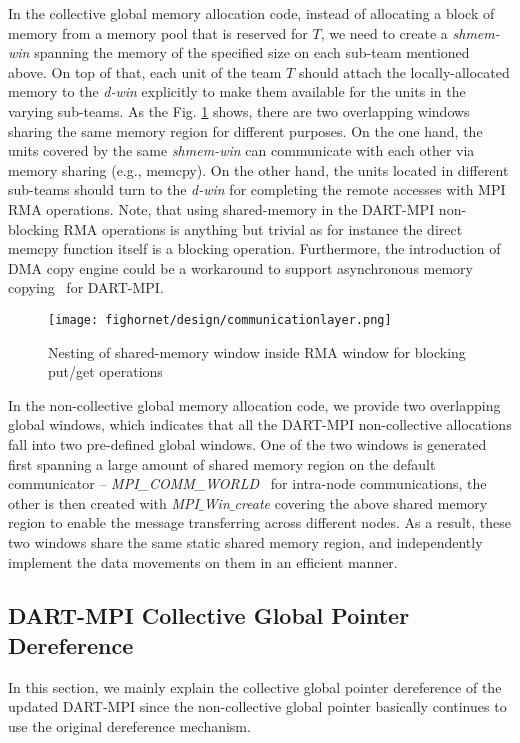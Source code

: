 \documentclass{llncs}
\begin{document}
{In the collective global memory allocation code, instead of allocating a block of memory 
from a memory pool that is reserved for $T$, we need to create a \mbox{\textit{shmem-win}} spanning the 
memory of the specified size on each sub-team mentioned above.
On top of that, each unit of the team $T$ should attach the locally-allocated memory
to the \mbox{\textit{d-win}} explicitly to make them available for the units in the varying \mbox{sub-teams}. As the 
Fig. \ref{structure} shows, there are two overlapping windows sharing the same memory region for different purposes.
On the one hand, the units covered by the same \mbox{\textit{shmem-win}} can communicate with each other via
memory sharing (e.g., memcpy). On the other hand, the units located in different \mbox{sub-teams} should turn to the \mbox{\textit{d-win}} for
completing the remote accesses with MPI RMA operations.
Note, that using shared-memory in the 
DART-MPI non-blocking RMA operations is anything but trivial as for instance the direct memcpy function itself 
is a blocking operation. Furthermore, the introduction of DMA copy engine could be a workaround to support 
asynchronous memory copying~\cite{async} for DART-MPI. 

\begin{figure}[tb]
\begin{center}
\texttt{[image: fighornet/design/communicationlayer.png]}
\end{center} 
\caption{Nesting of shared-memory window inside RMA window for blocking put/get operations}
\label{structure}
\end{figure}

In the \mbox{non-collective} global memory allocation code, we provide two overlapping global 
windows, 
which indicates that all the \mbox{DART-MPI} \mbox{non-collective} 
allocations fall into two \mbox{pre-defined} global windows. 
One of the two windows is generated first spanning a large amount of shared memory region 
on the default communicator -- {\em MPI\_COMM\_WORLD}~\cite{mpi3} for intra-node 
communications, the other is
then created with {\em MPI$\_$Win$\_$create} covering the above
shared memory region to enable the message transferring across different nodes. As a result,
these two windows share the same static shared memory region, and independently 
implement the data movements on them in an efficient manner.
\subsection{DART-MPI Collective Global Pointer Dereference}
In this section, we 
mainly explain the collective global pointer dereference of 
the updated \mbox{DART-MPI} since the \mbox{non-collective} global 
pointer basically continues to use the original dereference mechanism.

}
\end{document}
